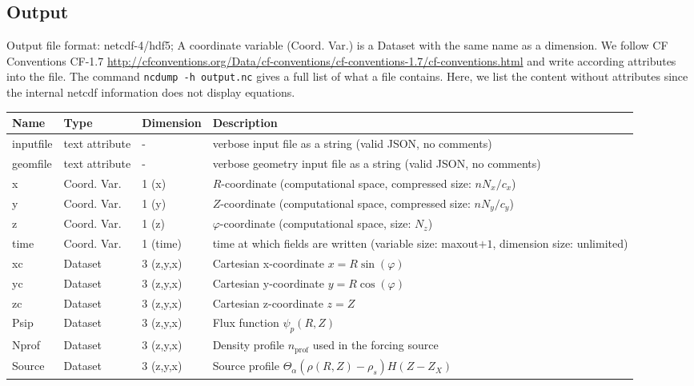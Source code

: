 \subsection{Output} \label{sec:output_file}
Output file format: netcdf-4/hdf5; A coordinate variable (Coord. Var.) is a Dataset with the same name as a dimension.
We follow CF Conventions CF-1.7
\url{http://cfconventions.org/Data/cf-conventions/cf-conventions-1.7/cf-conventions.html}
and write according attributes into the file.
The command \texttt{ncdump -h output.nc} gives a full list of what a file contains.
Here, we list the content without attributes
since the internal netcdf information does not display equations.
%
\begin{longtable}{lll>{\RaggedRight}p{7cm}}
\toprule
\rowcolor{gray!50}\textbf{Name} &  \textbf{Type} & \textbf{Dimension} & \textbf{Description}  \\ \midrule
inputfile  &     text attribute & - & verbose input file as a string (valid JSON, no comments) \\
geomfile   &     text attribute & - & verbose geometry input file as a string (valid JSON, no comments) \\
x                & Coord. Var. & 1 (x) & $R$-coordinate (computational space, compressed size: $nN_x/c_x$)\\
y                & Coord. Var. & 1 (y) & $Z$-coordinate (computational space, compressed size: $nN_y/c_y$)\\
z                & Coord. Var. & 1 (z) & $\varphi$-coordinate (computational space, size: $N_z$) \\
time             & Coord. Var. & 1 (time)& time at which fields are written (variable size: maxout$+1$, dimension size: unlimited) \\
xc           & Dataset & 3 (z,y,x) & Cartesian x-coordinate $x=R\sin(\varphi)$ \\
yc           & Dataset & 3 (z,y,x) & Cartesian y-coordinate $y=R\cos(\varphi)$\\
zc           & Dataset & 3 (z,y,x) & Cartesian z-coordinate $z=Z$ \\
Psip             & Dataset & 3 (z,y,x) & Flux function $\psi_p(R,Z)$ \\
Nprof            & Dataset & 3 (z,y,x) & Density profile $n_\text{prof}$ used in the forcing source \\
Source           & Dataset & 3 (z,y,x) & Source  profile $\Theta_\alpha(\rho(R,Z) - \rho_s) H(Z-Z_X)$\\

\end{longtable}
